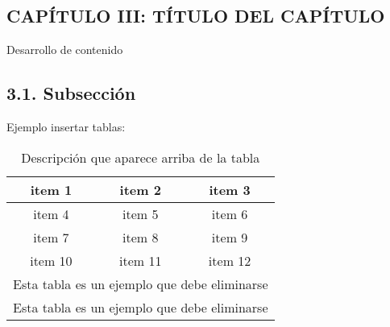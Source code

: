 \medspace
\vspace{1.5cm}
\begin{center}
	\section*{\large CAPÍTULO III: TÍTULO DEL CAPÍTULO}
\end{center}

\vspace{1cm}

Desarrollo de contenido
\subsection*{\normalsize 3.1. Subsección}

Ejemplo insertar tablas:

\begin{table}[h!]
	\centering
	\caption[Descripción que aparece en el índice de tablas]{Descripción que aparece arriba de la tabla}
	\begin{tabular}{c c c}
		\toprule
		item 1 & item 2 & item 3\\
		\toprule
		item 4 & item 5 & item 6\\
		item 7 & item 8 & item 9\\
		item 10 & item 11 & item 12\\
		\toprule
		\multicolumn{3}{c}{Esta tabla es un ejemplo que debe eliminarse}\\
		\multicolumn{3}{c}{Esta tabla es un ejemplo que debe eliminarse}	
	\end{tabular}
\end{table}

